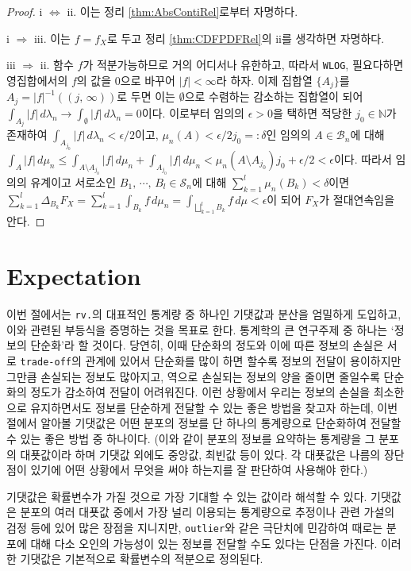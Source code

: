 \begin{proof}
    i $\Leftrightarrow$ ii. 이는 정리 \ref{thm:AbsContiRel}로부터 자명하다.

    i $\Rightarrow$ iii. 이는 $f=f_X$로 두고 정리 \ref{thm:CDFPDFRel}의 ii를 생각하면 자명하다.

    iii $\Rightarrow$ ii. 함수 $f$가 적분가능하므로 거의 어디서나 유한하고, 따라서 \texttt{WLOG}, 필요다하면 영집합에서의 $f$의 값을 $0$으로 바꾸어 $|f|<\infty$라 하자. 이제 집합열 $\{A_j\}$를 $A_j=|f|^{-1}((j,\,\infty))$로 두면 이는 $\emptyset$으로 수렴하는 감소하는 집합열이 되어 $\int_{A_j}|f|\,d\lambda_n\to\int_\emptyset|f|\,d\lambda_n=0$이다. 이로부터 임의의 $\epsilon>0$을 택하면 적당한 $j_0\in\mathbb{N}$가 존재하여 $\int_{A_{j_0}}|f|\,d\lambda_n<\epsilon/2$이고, $\mu_n(A)<\epsilon/2j_0=:\delta$인 임의의 $A\in\mathcal{B}_n$에 대해 $\int_A|f|\,d\mu_n\leq\int_{A\setminus A_{j_0}}|f|\,d\mu_n+\int_{A_{j_0}}|f|\,d\mu_n<\mu_n(A\setminus A_{j_0})j_0+\epsilon/2<\epsilon$이다. 따라서 임의의 유계이고 서로소인 $B_1,\,\cdots,\,B_l\in\mathcal{S}_n$에 대해 $\sum_{k=1}^l\mu_n(B_k)<\delta$이면 $\sum_{k=1}^l\Delta_{B_k}F_X=\sum_{k=1}^l\int_{B_k}f\,d\mu_n=\int_{\bigsqcup_{k=1}^lB_k}f\,d\mu<\epsilon$이 되어 $F_X$가 절대연속임을 안다.
\end{proof}

\section{Expectation}

이번 절에서는 \texttt{rv.}의 대표적인 통계량 중 하나인 기댓값과 분산을 엄밀하게 도입하고, 이와 관련된 부등식을 증명하는 것을 목표로 한다. 통계학의 큰 연구주제 중 하나는 `정보의 단순화'라 할 것이다. 당연히, 이때 단순화의 정도와 이에 따른 정보의 손실은 서로 \texttt{trade-off}의 관계에 있어서 단순화를 많이 하면 할수록 정보의 전달이 용이하지만 그만큼 손실되는 정보도 많아지고, 역으로 손실되는 정보의 양을 줄이면 줄일수록 단순화의 정도가 감소하여 전달이 어려워진다. 이런 상황에서 우리는 정보의 손실을 최소한으로 유지하면서도 정보를 단순하게 전달할 수 있는 좋은 방법을 찾고자 하는데, 이번 절에서 알아볼 기댓값은 어떤 분포의 정보를 단 하나의 통계량으로 단순화하여 전달할 수 있는 좋은 방법 중 하나이다. (이와 같이 분포의 정보를 요약하는 통계량을 그 분포의 대푯값이라 하며 기댓값 외에도 중앙값, 최빈값 등이 있다. 각 대푯값은 나름의 장단점이 있기에 어떤 상황에서 무엇을 써야 하는지를 잘 판단하여 사용해야 한다.) 

기댓값은 확률변수가 가질 것으로 가장 기대할 수 있는 값이라 해석할 수 있다. 기댓값은 분포의 여러 대푯값 중에서 가장 널리 이용되는 통계량으로 추정이나 관련 가설의 검정 등에 있어 많은 장점을 지니지만, \texttt{outlier}와 같은 극단치에 민감하여 때로는 분포에 대해 다소 오인의 가능성이 있는 정보를 전달할 수도 있다는 단점을 가진다. 이러한 기댓값은 기본적으로 확률변수의 적분으로 정의된다.


